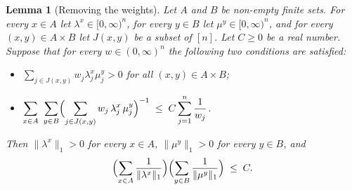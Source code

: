 \documentclass[11pt,reqno]{amsart}
\newtheorem{lemma}[theorem]{Lemma}
\theoremstyle{definition}
\theoremstyle{remark}
\numberwithin{equation}{section}
\theoremstyle{named}
\theoremstyle{plain}
\newcommand{\norm}[1]{\lVert #1\rVert_1}
\begin{document}
\begin{lemma}[Removing the weights]\label{lem:weights}
Let $A$ and $B$ be non-empty finite sets. For every $x\in A$ let $\lambda^{x}\in[0,\infty)^{n}$,
for every $y\in B$ let $\mu^{y}\in[0,\infty)^{n}$, and for every $(x,y)\in A\times B$ let $J(x,y)$
be a subset of $[n]$. Let $C\ge0$ be a real number. Suppose that for every $w\in(0,\infty)^{n}$ the
following two conditions are satisfied:
\begin{itemize}
\item[\textup{(i)}] $\sum_{j\in J(x,y)}w_j\lambda^{x}_j\mu^{y}_j>0$ for all $(x,y)\in A\times B$;
\item[\textup{(ii)}] $\displaystyle\sum_{x\in A}\ \sum_{y\in B}
\Bigl(\sum_{j\in J(x,y)}w_j\,\lambda^{x}_j\,\mu^{y}_j\Bigr)^{-1}\;\le\;C\sum_{j=1}^{n}\frac1{w_j}$.
\end{itemize}
Then $\norm{\lambda^{x}}>0$ for every $x\in A$, $\norm{\mu^{y}}>0$ for every $y\in B$, and
\[
   \Bigl(\sum_{x\in A}\frac1{\norm{\lambda^{x}}}\Bigr)
   \Bigl(\sum_{y\in B}\frac1{\norm{\mu^{y}}}\Bigr)\;\le\;C .
\]
\end{lemma}
\end{document}
